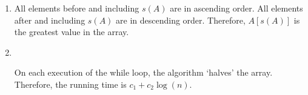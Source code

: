 \documentclass[fleqn, a4paper, 11pt, oneside]{amsart}
\theoremstyle{definition}
\theoremstyle{theorem}
\begin{document}
\begin{solution}
	\begin{enumerate}[leftmargin=*]
		\item
			All elements before and including $s(A)$ are in ascending order.
			All elements after and including $s(A)$ are in descending order.
			Therefore, $A[s(A)]$ is the greatest value in the array.
		\item
			~\\
			\begin{algorithm}[H]
				\begin{algorithmic}[1]
					\Statex
								\EndIf
								\EndIf
							\Else
								\Else
								\EndIf
							\EndIf
						\EndWhile
					\EndFunction
				\end{algorithmic}
				\caption{}
			\end{algorithm}
			On each execution of the while loop, the algorithm `halves' the array.
			Therefore, the running time is $c_1 + c_2 \log(n)$.
	\end{enumerate}
\end{solution}
\end{document}
